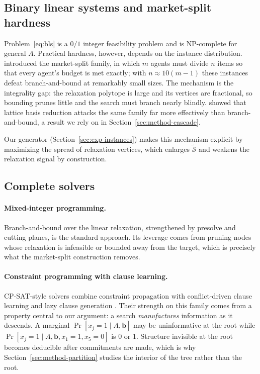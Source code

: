 \documentclass[preprint,12pt]{elsarticle}
\newcommand{\SOL}{\mathcal{S}}
\begin{document}
\subsection{Binary linear systems and market-split hardness}

Problem~\eqref{eq:bls} is a $0/1$ integer feasibility problem and is NP-complete for general $A$. Practical hardness, however, depends on the instance distribution. \citet{cornuejols1999market} introduced the market-split family, in which $m$ agents must divide $n$ items so that every agent's budget is met exactly; with $n\approx 10(m-1)$ these instances defeat branch-and-bound at remarkably small sizes. The mechanism is the integrality gap: the relaxation polytope is large and its vertices are fractional, so bounding prunes little and the search must branch nearly blindly. \citet{aardal2000market} showed that lattice basis reduction attacks the same family far more effectively than branch-and-bound, a result we rely on in Section~\ref{sec:method-cascade}.

Our generator (Section~\ref{sec:exp-instances}) makes this mechanism explicit by maximizing the spread of relaxation vertices, which enlarges $\tilde{\SOL}$ and weakens the relaxation signal by construction.

\subsection{Complete solvers}

\paragraph{Mixed-integer programming.} Branch-and-bound over the linear relaxation, strengthened by presolve and cutting planes, is the standard approach. Its leverage comes from pruning nodes whose relaxation is infeasible or bounded away from the target, which is precisely what the market-split construction removes.

\paragraph{Constraint programming with clause learning.} CP-SAT-style solvers combine constraint propagation with conflict-driven clause learning \citep{marquessilva1999grasp, moskewicz2001chaff} and lazy clause generation \citep{ohrimenko2009propagation}. Their strength on this family comes from a property central to our argument: a search \emph{manufactures} information as it descends. A marginal $\Pr[x_j=1\mid A,\mathbf{b}]$ may be uninformative at the root while $\Pr[x_j=1\mid A,\mathbf{b},x_1{=}1,x_5{=}0]$ is $0$ or $1$. Structure invisible at the root becomes deducible after commitments are made, which is why Section~\ref{sec:method-partition} studies the interior of the tree rather than the root.
\end{document}
